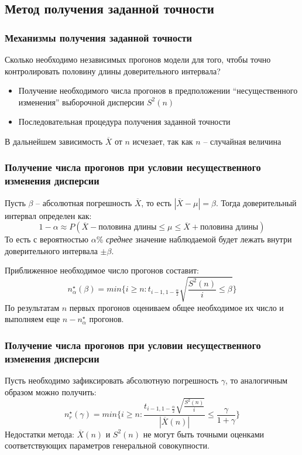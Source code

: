 \documentclass[utf8]{beamer}
\begin{document}
\subsection{Метод получения заданной точности}
\begin{frame}
\frametitle{Механизмы получения заданной точности}
Сколько необходимо независимых прогонов модели для того, чтобы точно контролировать половину длины доверительного интервала?
\begin{itemize}
	\item Получение необходимого числа прогонов в предположении
  ``несущественного изменения'' выборочной дисперсии $S^2 (n)$
  \item Последовательная процедура получения заданной точности
\end{itemize}
В дальнейшем зависимость $\overline{X}$ от $n$ исчезает, так как $n$ -- случайная величина
\end{frame}
\begin{frame}
\frametitle{Получение числа прогонов при условии несущественного изменения дисперсии}
Пусть $\beta$ -- абсолютная погрешность $\overline{X}$, то есть $|\overline{X}-\mu| = \beta$.
Тогда доверительный интервал определен как:
$$
1-\alpha \approx P(\overline{X}-\textrm{половина длины} \leq \mu \leq \overline{X}+\textrm{половина длины})
$$
То есть с вероятностью $\alpha$\% \emph{среднее} значение наблюдаемой будет
лежать внутри доверительного интервала $\pm \beta$.

Приближенное необходимое число прогонов составит:
$$
n_{\alpha}^{\star}(\beta) = min \Big\{ i\geq n : t_{i-1, 1-\frac{\alpha}{2}}
\sqrt{\frac{S^2(n)}{i} \leq \beta} \Big\}
$$
По результатам $n$ первых прогонов оцениваем общее необходимое их
число и выполняем еще $n - n_{\alpha}^{\star}$ прогонов.
\end{frame}
\begin{frame}
\frametitle{Получение числа прогонов при условии несущественного
изменения дисперсии}
Пусть необходимо зафиксировать абсолютную погрешность $\gamma$, то
аналогичным образом можно получить:
$$
n_{r}^{\star}(\gamma) = min \Big\{ i\geq n :
\frac{t_{i-1, 1-\frac{\alpha}{2}}\sqrt{\frac{S^2(n)}{i}}}{|\overline{X}(n)|} \leq \frac{\gamma}{1+\gamma} \Big\}
$$
Недостатки метода: $\overline{X}(n)$ и $S^2(n)$ не могут быть точными
оценками соответствующих параметров генеральной совокупности.
\end{frame}
\end{document}
